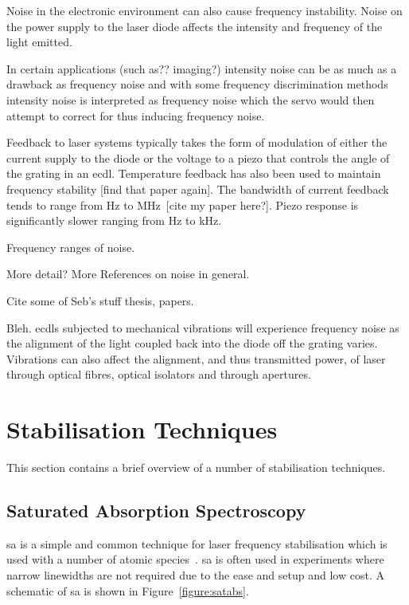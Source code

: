 Noise in the electronic environment can also cause frequency instability. Noise on the power supply to the laser diode affects the intensity and frequency of the light emitted.

In certain applications {\color{red}(such as?? imaging?)} intensity noise can be as much as a drawback as frequency noise and with some frequency discrimination methods intensity noise is interpreted as frequency noise which the servo would then attempt to correct for thus inducing frequency noise.

Feedback to laser systems typically takes the form of modulation of either the current supply to the diode or the voltage to a piezo that controls the angle of the grating in an \gls{ecdl}.
Temperature feedback has also been used to maintain frequency stability {\color{red}[find that paper again]}.
The bandwidth of current feedback tends to range from \unit[0]{Hz} to MHz~\cite{ludlow_compact_2007}{\color{red}[cite my paper here?]}.
Piezo response is significantly slower ranging from \unit[0]{Hz} to \unit[100]{kHz}.

{\color{red}Frequency ranges of noise.}

{\color{red}More detail? More References on noise in general.}

{\color{red}Cite some of Seb's stuff thesis\cite{saliba_cold_2011}, papers\cite{saliba_linewidths_2009, saliba_mode_2009}.}

Bleh.
\Glspl{ecdl} subjected to mechanical vibrations will experience frequency noise as the alignment of the light coupled back into the diode off the grating varies.
Vibrations can also affect the alignment, and thus transmitted power, of laser through optical fibres, optical isolators and through apertures.

\section{Stabilisation Techniques}

This section contains a brief overview of a number of stabilisation techniques.

\subsection{Saturated Absorption Spectroscopy}
\Gls{sa} is a simple and common technique for laser frequency stabilisation which is used with a number of atomic species~\cite{demtroder_laser_2003}.
\Gls{sa} is often used in experiments where narrow linewidths are not required due to the ease and setup and low cost.
A schematic of \gls{sa} is shown in Figure~\ref{figure:satabs}.

